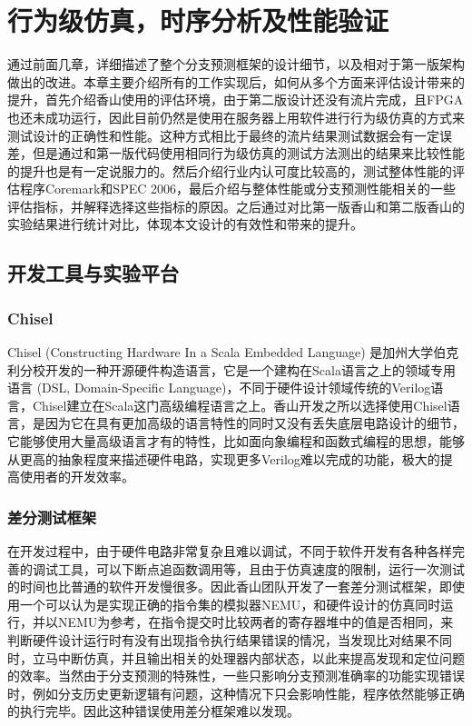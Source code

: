 \chapter{行为级仿真，时序分析及性能验证}

通过前面几章，详细描述了整个分支预测框架的设计细节，以及相对于第一版架构做出的改进。本章主要介绍所有的工作实现后，如何从多个方面来评估设计带来的提升，首先介绍香山使用的评估环境，由于第二版设计还没有流片完成，且FPGA也还未成功运行，因此目前仍然是使用在服务器上用软件进行行为级仿真的方式来测试设计的正确性和性能。这种方式相比于最终的流片结果测试数据会有一定误差，但是通过和第一版代码使用相同行为级仿真的测试方法测出的结果来比较性能的提升也是有一定说服力的。然后介绍行业内认可度比较高的，测试整体性能的评估程序Coremark和SPEC 2006，最后介绍与整体性能或分支预测性能相关的一些评估指标，并解释选择这些指标的原因。之后通过对比第一版香山和第二版香山的实验结果进行统计对比，体现本文设计的有效性和带来的提升。

\section{开发工具与实验平台}

\subsection{Chisel}

Chisel (Constructing Hardware In a Scala Embedded Language) 是加州大学伯克利分校开发的一种开源硬件构造语言，它是一个建构在Scala语言之上的领域专用语言 (DSL, Domain-Specific Language)，不同于硬件设计领域传统的Verilog语言，Chisel建立在Scala这门高级编程语言之上。香山开发之所以选择使用Chisel语言，是因为它在具有更加高级的语言特性的同时又没有丢失底层电路设计的细节，它能够使用大量高级语言才有的特性，比如面向象编程和函数式编程的思想，能够从更高的抽象程度来描述硬件电路，实现更多Verilog难以完成的功能，极大的提高使用者的开发效率。

\subsection{差分测试框架}

在开发过程中，由于硬件电路非常复杂且难以调试，不同于软件开发有各种各样完善的调试工具，可以下断点追函数调用等，且由于仿真速度的限制，运行一次测试的时间也比普通的软件开发慢很多。因此香山团队开发了一套差分测试框架，即使用一个可以认为是实现正确的指令集的模拟器NEMU\cite{nemu}，和硬件设计的仿真同时运行，并以NEMU为参考，在指令提交时比较两者的寄存器堆中的值是否相同，来判断硬件设计运行时有没有出现指令执行结果错误的情况，当发现比对结果不同时，立马中断仿真，并且输出相关的处理器内部状态，以此来提高发现和定位问题的效率。当然由于分支预测的特殊性，一些只影响分支预测准确率的功能实现错误时，例如分支历史更新逻辑有问题，这种情况下只会影响性能，程序依然能够正确的执行完毕。因此这种错误使用差分框架难以发现。


